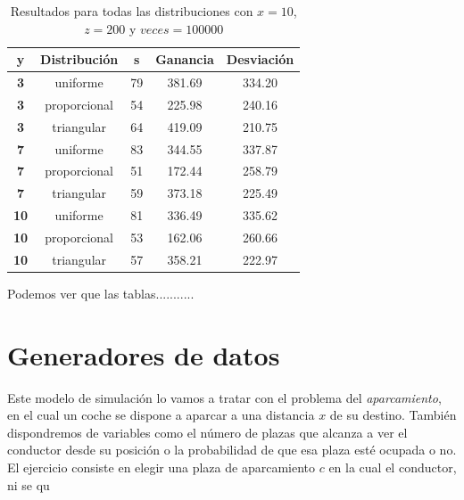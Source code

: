 \documentclass[11pt,a4paper]{report}
\begin{document}
\begin{table}[H]
	\centering
	\begin{tabular}{c|cccc}
	\textbf{\hspace{5mm}y\hspace{5mm}}   & \textbf{Distribución} & \textbf{\hspace{5mm}s\hspace{5mm}} & \textbf{Ganancia} & \textbf{Desviación} \\ \hline
	\textbf{3} & uniforme 			 	 & 79         & 381.69            & 334.20 			  \\
	\textbf{3} & proporcional			 & 54         & 225.98            & 240.16			  \\
	\textbf{3} & triangular 			 & 64         & 419.09            & 210.75			  \\ \hline
	\textbf{7} & uniforme 			 	 & 83         & 344.55            & 337.87 			  \\
	\textbf{7} & proporcional		     & 51         & 172.44            & 258.79			  \\
	\textbf{7} & triangular 		     & 59         & 373.18            & 225.49			  \\
	\textbf{10} & uniforme 				 & 81         & 336.49            & 335.62 			  \\
	\textbf{10} & proporcional			 & 53         & 162.06            & 260.66			  \\
	\textbf{10} & triangular 		     & 57         & 358.21            & 222.97			  \\ \hline
	\end{tabular}
	\caption{Resultados para todas las distribuciones con $x=10$, $z=200$ y $veces=100000$}
\end{table}

Podemos ver que las tablas...........



\chapter{Generadores de datos}

Este modelo de simulación lo vamos a tratar con el problema del \textit{aparcamiento}, en el cual un coche se dispone
a aparcar a una distancia $x$ de su destino. También dispondremos de variables como el número de plazas que alcanza a
ver el conductor desde su posición o la probabilidad de que esa plaza esté ocupada o no. El ejercicio consiste en elegir
una plaza de aparcamiento $c$ en la cual el conductor, ni se qu
\end{document}
